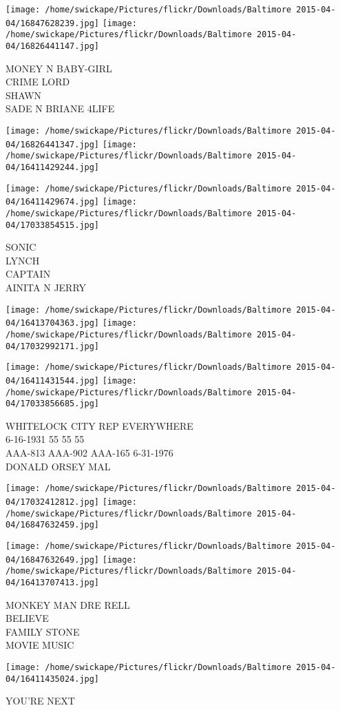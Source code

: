 \documentclass[10pt,letterpaper]{article}
\begin{document}
\texttt{[image: /home/swickape/Pictures/flickr/Downloads/Baltimore 2015-04-04/16847628239.jpg]}
\texttt{[image: /home/swickape/Pictures/flickr/Downloads/Baltimore 2015-04-04/16826441147.jpg]}

MONEY N BABY{-}GIRL\\
CRIME LORD\\
SHAWN\\
SADE N BRIANE 4LIFE
\pagebreak

\texttt{[image: /home/swickape/Pictures/flickr/Downloads/Baltimore 2015-04-04/16826441347.jpg]}
\texttt{[image: /home/swickape/Pictures/flickr/Downloads/Baltimore 2015-04-04/16411429244.jpg]}

\texttt{[image: /home/swickape/Pictures/flickr/Downloads/Baltimore 2015-04-04/16411429674.jpg]}
\texttt{[image: /home/swickape/Pictures/flickr/Downloads/Baltimore 2015-04-04/17033854515.jpg]}

SONIC\\
LYNCH\\
CAPTAIN\\
AINITA N JERRY
\pagebreak

\texttt{[image: /home/swickape/Pictures/flickr/Downloads/Baltimore 2015-04-04/16413704363.jpg]}
\texttt{[image: /home/swickape/Pictures/flickr/Downloads/Baltimore 2015-04-04/17032992171.jpg]}

\texttt{[image: /home/swickape/Pictures/flickr/Downloads/Baltimore 2015-04-04/16411431544.jpg]}
\texttt{[image: /home/swickape/Pictures/flickr/Downloads/Baltimore 2015-04-04/17033856685.jpg]}

WHITELOCK CITY REP EVERYWHERE\\
6{-}16{-}1931 55 55 55\\
AAA{-}813 AAA{-}902 AAA{-}165 6{-}31{-}1976\\
DONALD ORSEY MAL
\pagebreak

\texttt{[image: /home/swickape/Pictures/flickr/Downloads/Baltimore 2015-04-04/17032412812.jpg]}
\texttt{[image: /home/swickape/Pictures/flickr/Downloads/Baltimore 2015-04-04/16847632459.jpg]}

\texttt{[image: /home/swickape/Pictures/flickr/Downloads/Baltimore 2015-04-04/16847632649.jpg]}
\texttt{[image: /home/swickape/Pictures/flickr/Downloads/Baltimore 2015-04-04/16413707413.jpg]}

MONKEY MAN DRE RELL\\
BELIEVE\\
FAMILY STONE\\
MOVIE MUSIC
\pagebreak

\texttt{[image: /home/swickape/Pictures/flickr/Downloads/Baltimore 2015-04-04/16411435024.jpg]}

YOU'RE NEXT
\pagebreak
\end{document}
